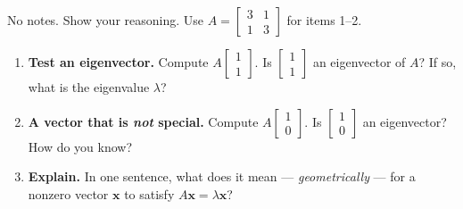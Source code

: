 \documentclass[10pt]{article}
\newcommand{\xx}{\mathbf{x}}
\begin{document}
\namedateperiod

\vspace{0.15in}

No notes. Show your reasoning. Use $A=\begin{bmatrix} 3 & 1 \\ 1 & 3 \end{bmatrix}$ for items 1--2.

\begin{enumerate}[leftmargin=1.8em, itemsep=16pt]
  \item \textbf{Test an eigenvector.} Compute $A\begin{bmatrix} 1 \\ 1 \end{bmatrix}$. Is
        $\begin{bmatrix} 1 \\ 1 \end{bmatrix}$ an eigenvector of $A$? If so, what is the eigenvalue
        $\lambda$?
        \vspace{1.3cm}
  \item \textbf{A vector that is \emph{not} special.} Compute $A\begin{bmatrix} 1 \\ 0 \end{bmatrix}$.
        Is $\begin{bmatrix} 1 \\ 0 \end{bmatrix}$ an eigenvector? How do you know?
        \vspace{1.3cm}
  \item \textbf{Explain.} In one sentence, what does it mean --- \emph{geometrically} --- for a nonzero
        vector $\xx$ to satisfy $A\xx=\lambda\xx$?
\end{enumerate}
\end{document}
